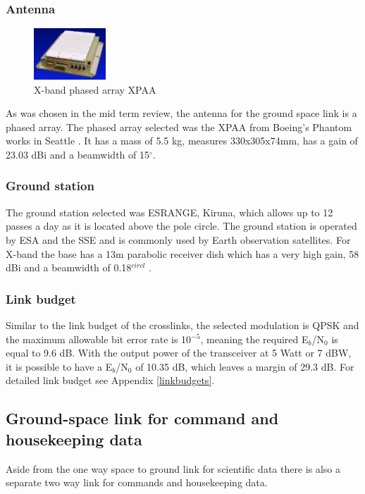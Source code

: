 \subsubsection{Antenna}
\begin{figure}[ht]
\vspace{-60pt}
  \begin{center}
    \includegraphics[width=0.24\textwidth]{chapters/img/XPAA.png}
  \end{center}
  \vspace{-15pt}
  \caption{X-band phased array XPAA}
  \vspace{-40pt}
  \label{XPAA}
\end{figure}
As was chosen in the mid term review, the antenna for the ground space link is a phased array. The phased array selected was the XPAA from Boeing's Phantom works in Seattle \cite{XPAA}. It has a mass of 5.5 kg, measures 330x305x74mm, has a gain of 23.03 dBi and a beamwidth of 15$^{\circ}$.
\subsubsection{Ground station}
The ground station selected was ESRANGE, Kiruna, which allows up to 12 passes a day as it is located above the pole circle. The ground station is operated by ESA and the SSE and is commonly used by Earth observation satellites. For X-band the base has a 13m parabolic receiver dish which has a very high gain, 58 dBi and a beamwidth of 0.18$^{circl}$ \cite{esrange}.

\subsubsection{Link budget}

Similar to the link budget of the crosslinks, the selected modulation is QPSK and the maximum allowable bit error rate is 10$^{-5}$, meaning the required E$_{b}$/N$_{0}$ is equal to 9.6 dB. With the output power of the transceiver at 5 Watt or 7 dBW, it is possible to have a E$_{b}$/N$_{0}$ of 10.35 dB, which leaves a margin of 29.3 dB. For detailed link budget see Appendix \ref{linkbudgets}.

\subsection{Ground-space link for command and housekeeping data}
Aside from the one way space to ground link for scientific data there is also a separate two way link for commands and housekeeping data. 

